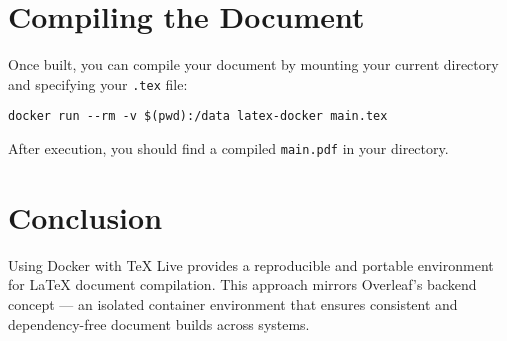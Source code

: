\section{Compiling the Document}

Once built, you can compile your document by mounting your current directory and specifying your \texttt{.tex} file:

\begin{verbatim}
docker run --rm -v $(pwd):/data latex-docker main.tex
\end{verbatim}

After execution, you should find a compiled \texttt{main.pdf} in your directory.

\section{Conclusion}

Using Docker with TeX Live provides a reproducible and portable environment for \LaTeX{} document compilation. This approach mirrors Overleaf's backend concept — an isolated container environment that ensures consistent and dependency-free document builds across systems.




